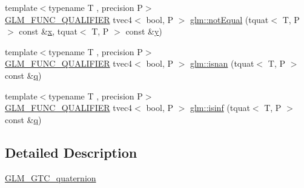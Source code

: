 \begin{DoxyCompactItemize}
\item 
{\footnotesize template$<$typename T , precision P$>$ }\\\mbox{\hyperlink{setup_8hpp_a33fdea6f91c5f834105f7415e2a64407}{G\+L\+M\+\_\+\+F\+U\+N\+C\+\_\+\+Q\+U\+A\+L\+I\+F\+I\+ER}} tvec4$<$ bool, P $>$ \mbox{\hyperlink{group__gtc__quaternion_ga484c4633f7c05d8e29ee8b452350f539}{glm\+::not\+Equal}} (tquat$<$ T, P $>$ const \&\mbox{\hyperlink{glad_8h_a92d0386e5c19fb81ea88c9f99644ab1d}{x}}, tquat$<$ T, P $>$ const \&\mbox{\hyperlink{glad_8h_a66ddd433d2cacfe27f5906b7e86faeed}{y}})
\item 
{\footnotesize template$<$typename T , precision P$>$ }\\\mbox{\hyperlink{setup_8hpp_a33fdea6f91c5f834105f7415e2a64407}{G\+L\+M\+\_\+\+F\+U\+N\+C\+\_\+\+Q\+U\+A\+L\+I\+F\+I\+ER}} tvec4$<$ bool, P $>$ \mbox{\hyperlink{group__gtc__quaternion_gad2fc52dd4ba5ff79cc56b3e0f9c092ed}{glm\+::isnan}} (tquat$<$ T, P $>$ const \&\mbox{\hyperlink{glad_8h_a514729309336df22bcc8eda979d6ced4}{q}})
\item 
{\footnotesize template$<$typename T , precision P$>$ }\\\mbox{\hyperlink{setup_8hpp_a33fdea6f91c5f834105f7415e2a64407}{G\+L\+M\+\_\+\+F\+U\+N\+C\+\_\+\+Q\+U\+A\+L\+I\+F\+I\+ER}} tvec4$<$ bool, P $>$ \mbox{\hyperlink{group__gtc__quaternion_ga0a850f06736d25887536d0da88e63c70}{glm\+::isinf}} (tquat$<$ T, P $>$ const \&\mbox{\hyperlink{glad_8h_a514729309336df22bcc8eda979d6ced4}{q}})
\end{DoxyCompactItemize}


\subsection{Detailed Description}
\mbox{\hyperlink{group__gtc__quaternion}{G\+L\+M\+\_\+\+G\+T\+C\+\_\+quaternion}} 